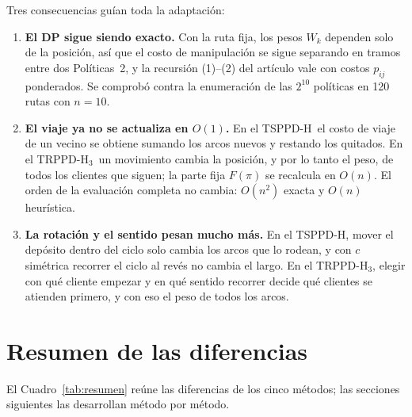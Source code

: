 \documentclass{article}
\newcommand{\TSPPDH}{TSPPD-H}
\newcommand{\TRPPDH}{TRPPD-H$_3$}
\begin{document}
\noindent Tres consecuencias guían toda la adaptación:
\begin{enumerate}[leftmargin=*]
  \item \textbf{El DP sigue siendo exacto.} Con la ruta fija, los pesos $W_k$ dependen solo de la posición, así que el costo de manipulación se sigue separando en tramos entre dos Políticas~2, y la recursión (1)--(2) del artículo vale con costos $p_{ij}$ ponderados. Se comprobó contra la enumeración de las $2^{10}$ políticas en 120 rutas con $n = 10$.
  \item \textbf{El viaje ya no se actualiza en $O(1)$.} En el \TSPPDH\ el costo de viaje de un vecino se obtiene sumando los arcos nuevos y restando los quitados. En el \TRPPDH\ un movimiento cambia la posición, y por lo tanto el peso, de todos los clientes que siguen; la parte fija $F(\pi)$ se recalcula en $O(n)$. El orden de la evaluación completa no cambia: $O(n^2)$ exacta y $O(n)$ heurística.
  \item \textbf{La rotación y el sentido pesan mucho más.} En el \TSPPDH, mover el depósito dentro del ciclo solo cambia los arcos que lo rodean, y con $c$ simétrica recorrer el ciclo al revés no cambia el largo. En el \TRPPDH, elegir con qué cliente empezar y en qué sentido recorrer decide qué clientes se atienden primero, y con eso el peso de todos los arcos.
\end{enumerate}

\section{Resumen de las diferencias}

El Cuadro~\ref{tab:resumen} reúne las diferencias de los cinco métodos; las secciones siguientes las desarrollan método por método.
\end{document}
